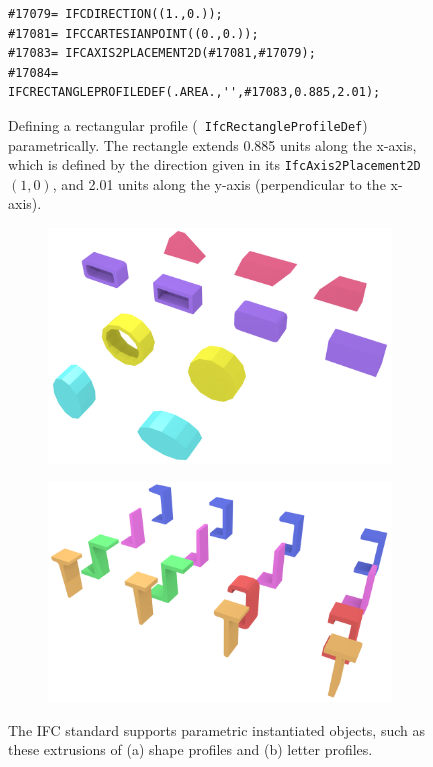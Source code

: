 \begin{figure}
\begin{lstlisting}[frame=single]
#17079= IFCDIRECTION((1.,0.));
#17081= IFCCARTESIANPOINT((0.,0.));
#17083= IFCAXIS2PLACEMENT2D(#17081,#17079);
#17084= IFCRECTANGLEPROFILEDEF(.AREA.,'',#17083,0.885,2.01);
\end{lstlisting}
\caption{Defining a rectangular profile (\ie\ \texttt{IfcRectangleProfileDef}) parametrically.
The rectangle extends 0.885 units along the x-axis, which is defined by the direction given in its \texttt{IfcAxis2Placement2D} \((1,0)\), and 2.01 units along the y-axis (perpendicular to the x-axis).}%
\label{fig:parametric}
\end{figure}

\begin{figure}
\centering
\begin{subfigure}[b]{0.45\linewidth}
	\includegraphics[width=\linewidth]{figs/profiles}%
	\label{subfig:profiles}
\end{subfigure}
\begin{subfigure}[b]{0.45\linewidth}
	\includegraphics[width=\linewidth]{figs/letter_profiles}%
	\label{subfig:letter-profiles}
\end{subfigure}
\caption{The IFC standard supports parametric instantiated objects, such as these extrusions of (a) shape profiles and (b) letter profiles.}%
\label{fig:profiles}
\end{figure}

